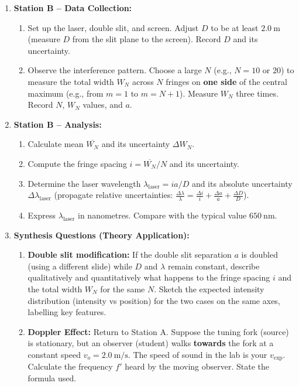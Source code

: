 \documentclass[11pt]{article}
\begin{document}
\begin{enumerate}
\begin{enumerate}
        \item Compare $v_{\text{exp}}$ and $v_{\text{th}}$. Do they agree within experimental uncertainty? Comment on the end correction $e = \lambda/4 - \overline{L_1}$.
    \end{enumerate}
    \item \textbf{Station B -- Data Collection:} 
    \begin{enumerate}
        \item Set up the laser, double slit, and screen. Adjust $D$ to be at least $\SI{2.0}{\metre}$ (measure $D$ from the slit plane to the screen). Record $D$ and its uncertainty.
        \item Observe the interference pattern. Choose a large $N$ (e.g., $N=10$ or $20$) to measure the total width $W_N$ across $N$ fringes on \textbf{one side} of the central maximum (e.g., from $m=1$ to $m=N+1$). Measure $W_N$ three times. Record $N$, $W_N$ values, and $a$.
    \end{enumerate}
    \item \textbf{Station B -- Analysis:} 
    \begin{enumerate}
        \item Calculate mean $\overline{W_N}$ and its uncertainty $\Delta W_N$.
        \item Compute the fringe spacing $i = \overline{W_N}/N$ and its uncertainty.
        \item Determine the laser wavelength $\lambda_{\text{laser}} = i a / D$ and its absolute uncertainty $\Delta \lambda_{\text{laser}}$ (propagate relative uncertainties: $\frac{\Delta \lambda}{\lambda} = \frac{\Delta i}{i} + \frac{\Delta a}{a} + \frac{\Delta D}{D}$).
        \item Express $\lambda_{\text{laser}}$ in nanometres. Compare with the typical value $\SI{650}{\nano\metre}$.
    \end{enumerate}
    \item \textbf{Synthesis Questions (Theory Application):} 
    \begin{enumerate}
        \item \textbf{Double slit modification:} If the double slit separation $a$ is doubled (using a different slide) while $D$ and $\lambda$ remain constant, describe qualitatively and quantitatively what happens to the fringe spacing $i$ and the total width $W_N$ for the same $N$. Sketch the expected intensity distribution (intensity vs position) for the two cases on the same axes, labelling key features.
        \item \textbf{Doppler Effect:} Return to Station A. Suppose the tuning fork (source) is stationary, but an observer (student) walks \textbf{towards} the fork at a constant speed $v_o = \SI{2.0}{\metre\per\second}$. The speed of sound in the lab is your $v_{\text{exp}}$. Calculate the frequency $f'$ heard by the moving observer. State the formula used.

\end{enumerate}
\end{enumerate}
\end{document}

